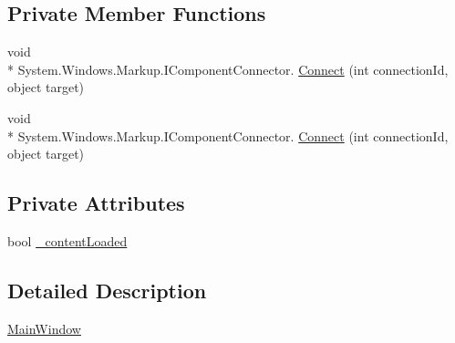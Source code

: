 \subsection*{Private Member Functions}
\begin{DoxyCompactItemize}
\item 
void \\*
System.\-Windows.\-Markup.\-I\-Component\-Connector. \hyperlink{classWpfApplication4_1_1MainWindow_aa918d7d7cc134fa18ca064739925be9a}{Connect} (int connection\-Id, object target)
\item 
void \\*
System.\-Windows.\-Markup.\-I\-Component\-Connector. \hyperlink{classWpfApplication4_1_1MainWindow_aa918d7d7cc134fa18ca064739925be9a}{Connect} (int connection\-Id, object target)
\end{DoxyCompactItemize}
\subsection*{Private Attributes}
\begin{DoxyCompactItemize}
\item 
bool \hyperlink{classWpfApplication4_1_1MainWindow_a39b4ae67911d755f5cccb22a5e80fe32}{\-\_\-content\-Loaded}
\end{DoxyCompactItemize}


\subsection{Detailed Description}
\hyperlink{classWpfApplication4_1_1MainWindow}{Main\-Window} 



